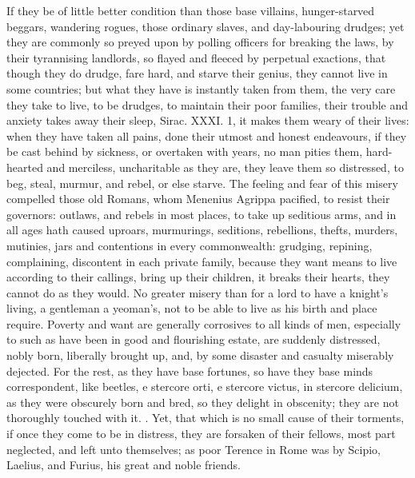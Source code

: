 {If they be of little better condition than those base villains,
hunger-starved beggars, wandering rogues, those ordinary slaves, and
day-labouring drudges; yet they are commonly so preyed upon by 
polling officers for breaking the laws, by their tyrannising landlords,
so flayed and fleeced by perpetual exactions, that though they do
drudge, fare hard, and starve their genius, they cannot live in
some countries; but what they have is instantly taken from them,
the very care they take to live, to be drudges, to maintain their poor
families, their trouble and anxiety takes away their sleep, Sirac.
XXXI. 1, it makes them weary of their lives: when they have taken all
pains, done their utmost and honest endeavours, if they be cast behind
by sickness, or overtaken with years, no man pities them, hard-hearted
and merciless, uncharitable as they are, they leave them so distressed,
to beg, steal, murmur, and  rebel, or else starve. The feeling
and fear of this misery compelled those old Romans, whom Menenius
Agrippa pacified, to resist their governors: outlaws, and rebels in
most places, to take up seditious arms, and in all ages hath caused
uproars, murmurings, seditions, rebellions, thefts, murders, mutinies,
jars and contentions in every commonwealth: grudging, repining,
complaining, discontent in each private family, because they want means
to live according to their callings, bring up their children, it breaks
their hearts, they cannot do as they would. No greater misery than for
a lord to have a knight's living, a gentleman a yeoman's, not to be
able to live as his birth and place require. Poverty and want are
generally corrosives to all kinds of men, especially to such as have
been in good and flourishing estate, are suddenly distressed,
nobly born, liberally brought up, and, by some disaster and
casualty miserably dejected. For the rest, as they have base fortunes,
so have they base minds correspondent, like beetles, e stercore orti, e
stercore victus, in stercore delicium, as they were obscurely born and
bred, so they delight in obscenity; they are not thoroughly touched
with it. . Yet, that
which is no small cause of their torments, if once they come to be in
distress, they are forsaken of their fellows, most part neglected, and
left unto themselves; as poor Terence in Rome was by Scipio,
Laelius, and Furius, his great and noble friends.

}
